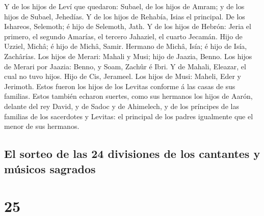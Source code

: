  Y de los hijos de Leví que quedaron: Subael, de los hijos
de Amram; y de los hijos de Subael, Jehedías.  Y de los
hijos de Rehabía, Isias el principal.  De los Ishareos,
Selemoth; é hijo de Selemoth, Jath.  Y de los hijos de
Hebrón: Jeria el primero, el segundo Amarías, el tercero Jahaziel, el
cuarto Jecamán.  Hijo de Uzziel, Michâ; é hijo de Michâ,
Samir.  Hermano de Michâ, Isía; é hijo de Isía, Zachârías.
 Los hijos de Merari: Mahali y Musi; hijo de Jaazia, Benno.
 Los hijos de Merari por Jaazia: Benno, y Soam, Zachûr é
Ibri.  Y de Mahali, Eleazar, el cual no tuvo hijos.
 Hijo de Cis, Jerameel.  Los hijos de Musi:
Maheli, Eder y Jerimoth. Estos fueron los hijos de los Levitas conforme
á las casas de sus familias.  Estos también echaron
suertes, como sus hermanos los hijos de Aarón, delante del rey David, y
de Sadoc y de Ahimelech, y de los príncipes de las familias de los
sacerdotes y Levitas: el principal de los padres igualmente que el menor
de sus hermanos.

\hypertarget{el-sorteo-de-las-24-divisiones-de-los-cantantes-y-muxfasicos-sagrados}{%
\subsection{El sorteo de las 24 divisiones de los cantantes y músicos
sagrados}\label{el-sorteo-de-las-24-divisiones-de-los-cantantes-y-muxfasicos-sagrados}}

\hypertarget{section-24}{%
\section{25}\label{section-24}}


